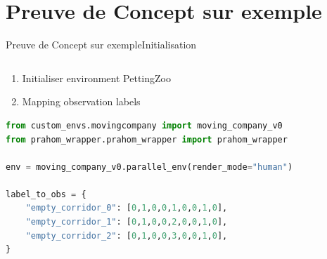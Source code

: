 

\section{Preuve de Concept sur exemple}

\begin{frame}[fragile]{Preuve de Concept sur exemple}{Initialisation}

    \begin{columns}

        \begin{column}{0.6\textwidth}

            \begin{enumerate}
                \item Initialiser environment PettingZoo
                \item Mapping observation labels
            \end{enumerate}
    
\begin{lstlisting}[language=Python,basicstyle=\scriptsize]
from custom_envs.movingcompany import moving_company_v0
from prahom_wrapper.prahom_wrapper import prahom_wrapper

env = moving_company_v0.parallel_env(render_mode="human")

label_to_obs = {
    "empty_corridor_0": [0,1,0,0,1,0,0,1,0],
    "empty_corridor_1": [0,1,0,0,2,0,0,1,0],
    "empty_corridor_2": [0,1,0,0,3,0,0,1,0],
}
\end{lstlisting}
    
        \end{column}
    

\end{columns}
\end{frame}
